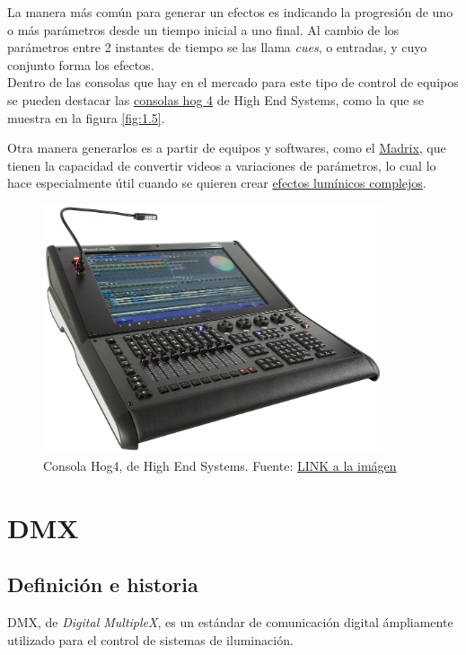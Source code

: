 La manera más común para generar un efectos es indicando la progresión de uno o más parámetros desde un tiempo inicial a uno final. Al cambio de los parámetros entre 2 instantes de tiempo se las llama \textit{cues}, o entradas, y cuyo conjunto forma los efectos. \\
Dentro de las consolas que hay en el mercado para este tipo de control de equipos se pueden destacar las \href{https://www.highend.com/products/consoles}{consolas hog 4} de High End Systems, como la que se muestra en la figura \ref{fig:1.5}.

Otra manera generarlos es a partir de equipos y softwares, como el \href{https://www.madrix.com/}{Madrix}, que tienen la capacidad de convertir videos a variaciones de parámetros, lo cual lo hace especialmente útil cuando se quieren crear \href{https://www.youtube.com/watch?v=mdbl5ks7Nu0}{efectos lumínicos complejos}.


\begin{figure}[!ht]
	\centering
	\includegraphics[width=10cm,scale=1]{resources/1_5-consolaHOG.png}
	\caption{Consola Hog4, de High End Systems. Fuente: \href{https://www.highend.com/products/consoles}{LINK a la imágen}}
	\label{fig:\thefigure}
\end{figure}

\newpage
\section{DMX} \label{sec:\thesection}
\subsection{Definición e historia}
DMX, de \textit{Digital MultipleX}, es un estándar de comunicación digital ámpliamente utilizado para el control de sistemas de iluminación. 

